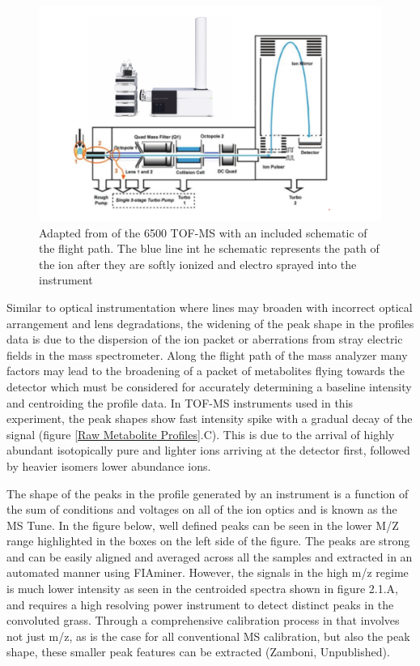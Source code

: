 \documentclass[a4paper]{book}
\begin{document}
	\begin{figure}[hbt!]
		\centering
		\includegraphics[width=0.8\linewidth]{3.Metabolomics/MS.pdf}
		\caption{Adapted from \citep{AgilentTechnologies2017} of the 6500 TOF-MS with an included schematic of the flight path. The blue line int he schematic represents the path of the ion after they are softly ionized and electro sprayed into the instrument }
		\label{fig:A schematic of the 6550 Time-of-flight Mass spectrometer}
	\end{figure}
	
	Similar to optical instrumentation where lines may broaden with incorrect optical arrangement and lens degradations, the widening of the peak shape in the profiles data is due to the dispersion of the ion packet or aberrations from stray electric fields in the mass spectrometer\citep{Glish2003TheCentury}. Along the flight path of the mass analyzer many factors may lead to the broadening of a packet of metabolites flying towards the detector which must be considered for accurately determining a baseline intensity and centroiding the profile data. In TOF-MS instruments used in this experiment, the peak shapes show fast intensity spike with a gradual decay of the signal (figure \ref{Raw Metabolite Profiles}.C). This is due to the arrival of highly abundant isotopically pure and lighter ions arriving at the detector first, followed by heavier isomers lower abundance ions.
	
	The shape of the peaks in the profile generated by an instrument is a function of the sum of conditions and voltages on all of the ion optics and is known as the MS Tune. In the figure below, well defined peaks can be seen in the lower M/Z range highlighted in the boxes on the left side of the figure. The peaks are strong and can be easily aligned and averaged across all the samples and extracted in an automated manner using FIAminer. However, the signals in the high m/z regime is much lower intensity as seen in the centroided spectra shown in figure 2.1.A, and requires a high resolving power instrument to detect distinct peaks in the convoluted grass. Through a comprehensive calibration process in that involves not just m/z, as is the case for all conventional MS calibration, but also the peak shape, these smaller peak features can be extracted (Zamboni, Unpublished). 
	
\end{document}
